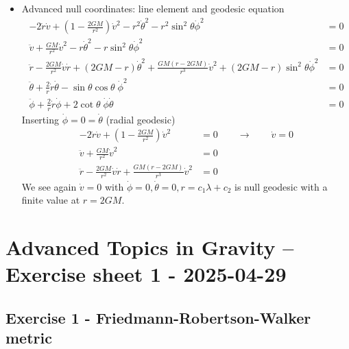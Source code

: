 \documentclass[10pt,a4paper]{article}
\theoremstyle{definition}
\begin{document}
\begin{enumerate}
\begin{itemize}[(a)]
\item Advanced null coordinates: line element and geodesic equation
\begin{align}
-2\dot{r}\dot{v}+\left(1-\frac{2GM}{r^2}\right)\dot{v}^2-r^2\dot{\theta}^2-r^2\sin^2\theta\dot{\phi}^2&=0\\
\ddot{v}+\frac{GM}{r^2}\dot{v}^2-r\dot{\theta}^2-r\sin^2\theta\dot{\phi}^2&=0\\
\ddot{r}-\frac{2GM}{r^2}\dot{v}\dot{r}+(2GM-r)\dot{\theta}^2+\frac{GM(r-2GM)}{r^3}\dot{v}^2+(2GM-r)\sin^2\theta\dot{\phi}^2&=0\\
\ddot{\theta}+\frac{2}{r}\dot{r}\dot{\theta}-\sin\theta\cos\theta\;\dot{\phi}^2&=0\\
\ddot{\phi}+\frac{2}{r}\dot{r}\dot{\phi}+2\cot\theta\;\dot{\phi}\dot{\theta}&=0
\end{align}
Inserting $\dot{\phi}=0=\dot{\theta}$ (radial geodesic)
\begin{align}
-2\dot{r}\dot{v}+\left(1-\frac{2GM}{r^2}\right)\dot{v}^2&=0\qquad\rightarrow\qquad\dot{v}=0\\
\ddot{v}+\frac{GM}{r^2}\dot{v}^2&=0\\
\ddot{r}-\frac{2GM}{r^2}\dot{v}\dot{r}+\frac{GM(r-2GM)}{r^3}\dot{v}^2&=0
\end{align}
We see again $\dot{v}=0$ with $\dot{\phi}=0, \dot{\theta}=0, r=c_1\lambda+c_2$ is null geodesic with a finite value at $r=2GM$.

\end{itemize}
\end{enumerate}

\newpage
\section*{Advanced Topics in Gravity – Exercise sheet 1 - 2025-04-29}
\subsection*{Exercise 1 - Friedmann-Robertson-Walker metric}
\end{document}
